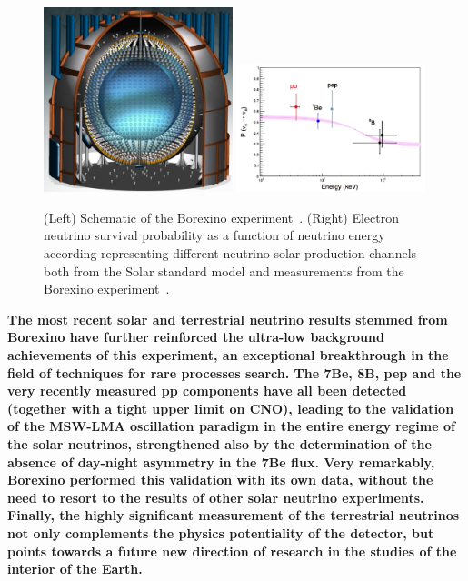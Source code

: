 \begin{figure}[h!]
\centering
  \centering
\includegraphics[width=0.49\textwidth]{figures/borexino.jpeg}
\includegraphics[width=0.49\textwidth]{figures/borexino3.jpeg}
\vspace{2mm}
\caption{(Left) Schematic of the Borexino experiment~\cite{63Borexino}. (Right) Electron neutrino survival probability as a function of neutrino energy according representing different neutrino solar production channels both from the Solar standard model and measurements from the Borexino experiment~\cite{63Borexino}.}
\label{fig:borexino}
\end{figure}

\textbf{The most recent solar and terrestrial neutrino results stemmed from Borexino have further reinforced the ultra-low background achievements of this experiment, an exceptional breakthrough in the field of techniques for rare processes search. The 7Be, 8B, pep and the very recently measured pp components have all been detected (together with a tight upper limit on CNO), leading to the validation of the MSW-LMA oscillation paradigm in the entire energy regime of the solar neutrinos, strengthened also by the determination of the absence of day-night asymmetry in the 7Be flux. Very remarkably, Borexino performed this validation with its own data, without the need to resort to the results of other solar neutrino experiments.
Finally, the highly significant measurement of the terrestrial neutrinos not only complements the physics potentiality of the detector, but points towards a future new direction of research in the studies of the interior of the Earth.}
\fi

